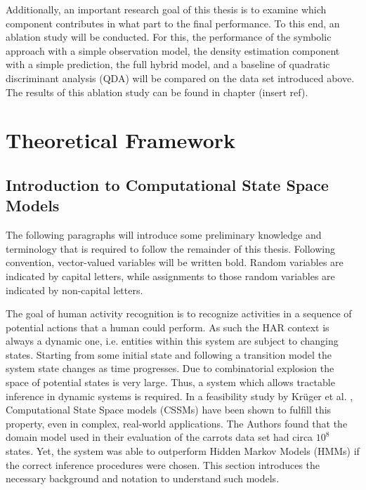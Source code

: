 \documentclass[11pt,titlepage,oneside,openany]{book}
\begin{document}
Additionally, an important research goal of this thesis is to examine which component contributes in what part to the final performance. To this end, an ablation study will be conducted. For this, the performance of the symbolic approach with a simple observation model, the density estimation component with a simple prediction, the full hybrid model, and a baseline of quadratic discriminant analysis (QDA) will be compared on the data set introduced above. The results of this ablation study can be found in chapter (insert ref).

 
 



\chapter{Theoretical Framework}
\label{cha:theory}

\section{Introduction to Computational State Space Models}
\label{sec:cssm}
The following paragraphs will introduce some preliminary knowledge and terminology that is required to follow the remainder  of this thesis. Following convention, vector-valued variables will be written bold. Random variables are indicated by capital letters, while assignments to those random variables are indicated by non-capital letters.

The goal of human activity recognition is to recognize activities in a sequence of potential actions that a human could perform. As such the HAR context is always a dynamic one, i.e. entities within this system are subject to changing states. Starting from some initial state and following a transition model the system state changes as time progresses. Due to combinatorial explosion the space of potential states is very large. Thus, a system which allows tractable inference in dynamic systems is required. In a feasibility study by Kr\"uger et al.  \cite{kruger_computational_2014}, Computational State Space models (CSSMs) have been shown to fulfill this property, even in complex, real-world applications. The Authors found that the domain model used in their evaluation of the carrots data set had circa $10^8$ states. Yet, the system was able to outperform Hidden Markov Models (HMMs) if the correct inference procedures were chosen. This section introduces the necessary background and notation to understand such models.
\end{document}

